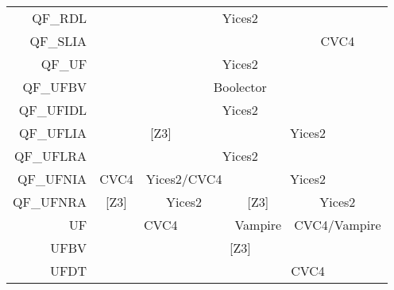 \begin{table}
{\begin{tabular}{|rcccc|}
\multicolumn{1}{|r|}{QF\_RDL}    & \multicolumn{4}{c|}{Yices2}                                                                                                                 \\ \cline{2-5}
QF\_SLIA                         & \multicolumn{1}{l}{}          & \multicolumn{1}{l}{}                & \multicolumn{1}{l|}{}         & \multicolumn{1}{c|}{CVC4}             \\ \cline{2-5}
\multicolumn{1}{|r|}{QF\_UF}     & \multicolumn{4}{c|}{Yices2}                                                                                                                 \\ \cline{2-5}
\multicolumn{1}{|r|}{QF\_UFBV}   & \multicolumn{4}{c|}{Boolector}                                                                                                              \\ \cline{2-5}
\multicolumn{1}{|r|}{QF\_UFIDL}  & \multicolumn{4}{c|}{Yices2}                                                                                                                 \\ \cline{2-5}
\multicolumn{1}{|r|}{QF\_UFLIA}  & \multicolumn{2}{c|}{{[}Z3{]}}                                       & \multicolumn{2}{c|}{Yices2}                                           \\ \cline{2-5}
\multicolumn{1}{|r|}{QF\_UFLRA}  & \multicolumn{4}{c|}{Yices2}                                                                                                                 \\ \cline{2-5}
\multicolumn{1}{|r|}{QF\_UFNIA}  & \multicolumn{1}{c|}{CVC4}     & \multicolumn{1}{c|}{Yices2/CVC4}    & \multicolumn{2}{c|}{Yices2}                                           \\ \cline{2-5}
\multicolumn{1}{|r|}{QF\_UFNRA}  & \multicolumn{1}{c|}{{[}Z3{]}} & \multicolumn{1}{c|}{Yices2}         & \multicolumn{1}{c|}{{[}Z3{]}} & \multicolumn{1}{c|}{Yices2}           \\ \cline{2-5}
\multicolumn{1}{|r|}{UF}         & \multicolumn{2}{c|}{CVC4}                                           & \multicolumn{1}{c|}{Vampire}  & \multicolumn{1}{c|}{CVC4/Vampire}     \\ \cline{2-5}
\multicolumn{1}{|r|}{UFBV}       & \multicolumn{4}{c|}{{[}Z3{]}}                                                                                                               \\ \cline{2-5}
UFDT                             & \multicolumn{1}{l}{}          & \multicolumn{1}{l|}{}               & \multicolumn{2}{c|}{CVC4}                                             \\ \cline{4-5}

\end{tabular}}
\end{table}
